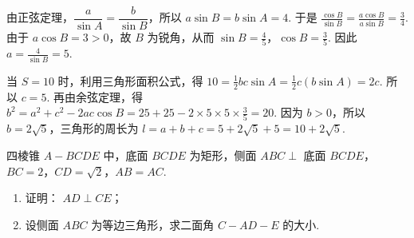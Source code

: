 \begin{solution}
由正弦定理，\(\dfrac{a}{\sin A}=\dfrac{b}{\sin B}\)，所以
\(
a\sin B=b\sin A=4
\).
于是
\(
\frac{\cos B}{\sin B}=\frac{a\cos B}{a\sin B}=\frac{3}{4}
\).
由于 \(a\cos B=3>0\)，故 \(B\) 为锐角，从而
\(
\sin B=\frac{4}{5}
\)，\(\cos B=\frac{3}{5}\).
因此
\(
a=\frac{4}{\sin B}=5
\).

当 \(S=10\) 时，利用三角形面积公式，得
\(
10=\frac{1}{2}bc\sin A=\frac{1}{2}c\left(b\sin A\right)=2c
\).
所以 \(c=5\). 再由余弦定理，得
\(
b^2=a^2+c^2-2ac\cos B=25+25-2\times5\times5\times\frac{3}{5}=20
\).
因为 \(b>0\)，所以 \(b=2\sqrt{5}\)，三角形的周长为
\(
l=a+b+c=5+2\sqrt{5}+5=10+2\sqrt{5}
\).
\end{solution}

\begin{problem}
四棱锥 \(A - BCDE\) 中，底面 \(BCDE\) 为矩形，侧面 \(ABC \perp\) 底面 \(BCDE\)，\(BC = 2\)，\(CD = \sqrt{2}\)，\(AB = AC\).

\begin{enumerate}
\item 证明： \(AD \perp CE\)；
\item 设侧面 \(ABC\) 为等边三角形，求二面角 \(C - AD - E\) 的大小.
\end{enumerate}

\end{problem}

